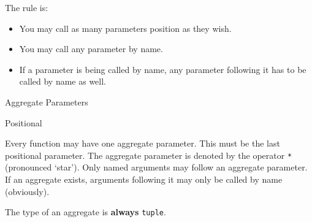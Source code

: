 \begin{frame}

The rule is:

\begin{itemize}
\itemsep1pt\parskip0pt
\item
  You may call as many parameters position as they wish.
\item
  You may call any parameter by name.
\item
  If a parameter is being called by name, any parameter following it has
  to be called by name as well.
\end{itemize}

\end{frame}

\begin{frame}{Aggregate Parameters}

\end{frame}

\begin{frame}

\begin{block}{Positional}

Every function may have one aggregate parameter. This must be the last
positional parameter. The aggregate parameter is denoted by the operator
\texttt{*} (pronounced `star'). Only named arguments may follow an
aggregate parameter. If an aggregate exists, arguments following it may
only be called by name (obviously).

\end{block}

\end{frame}

\begin{frame}[fragile]

\begin{Shaded}
\begin{Highlighting}[]
 \NormalTok{):}
\NormalTok{,}\NormalTok{,}\NormalTok{,}\NormalTok{)  }
\NormalTok{,}\NormalTok{,}\NormalTok{,}\NormalTok{,}\NormalTok{,}\NormalTok{,}\NormalTok{,}\NormalTok{,}\NormalTok{)  }
\NormalTok{)  }
\NormalTok{)  }
\NormalTok{)  }
\end{Highlighting}
\end{Shaded}

The type of an aggregate is \textbf{always} \texttt{tuple}.

\end{frame}

